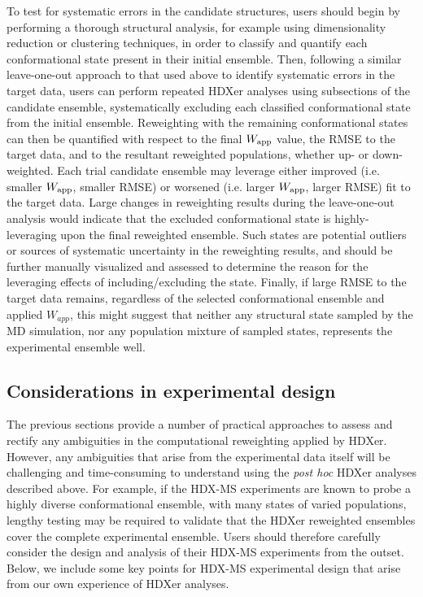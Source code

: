 \documentclass[9pt,tutorial]{livecoms}
\begin{document}
To test for systematic errors in the candidate structures, users should begin by performing a thorough structural analysis, for example using dimensionality reduction or clustering techniques, in order to classify and quantify each conformational state present in their initial ensemble.
Then, following a similar leave-one-out approach to that used above to identify systematic errors in the target data, users can perform repeated HDXer analyses using subsections of the candidate ensemble, systematically excluding each classified conformational state from the initial ensemble. 
Reweighting with the remaining conformational states can then be quantified with respect to the final $W_{\textnormal{app}}$ value, the RMSE to the target data, and to the resultant reweighted populations, whether up- or down-weighted.
Each trial candidate ensemble may leverage either improved (i.e. smaller $W_{\textnormal{app}}$, smaller RMSE) or worsened (i.e. larger $W_{\textnormal{app}}$, larger RMSE) fit to the target data.
Large changes in reweighting results during the leave-one-out analysis would indicate that the excluded conformational state is highly-leveraging upon the final reweighted ensemble.
Such states are potential outliers or sources of systematic uncertainty in the reweighting results, and should be further manually visualized and assessed to determine the reason for the leveraging effects of including/excluding the state.
Finally, if large RMSE to the target data remains, regardless of the selected conformational ensemble and applied $W_{app}$, this might suggest that neither any structural state sampled by the MD simulation, nor any population mixture of sampled states, represents the experimental ensemble well.

\subsection{Considerations in experimental design}\label{expt_design_sect}
The previous sections provide a number of practical approaches to assess and rectify any ambiguities in the computational reweighting applied by HDXer.
However, any ambiguities that arise from the experimental data itself will be challenging and time-consuming to understand using the \textit{post hoc} HDXer analyses described above.
For example, if the HDX-MS experiments are known to probe a highly diverse conformational ensemble, with many states of varied populations, lengthy testing may be required to validate that the HDXer reweighted ensembles cover the complete experimental ensemble.
Users should therefore carefully consider the design and analysis of their HDX-MS experiments from the outset.
Below, we include some key points for HDX-MS experimental design that arise from our own experience of HDXer analyses.
\end{document}
